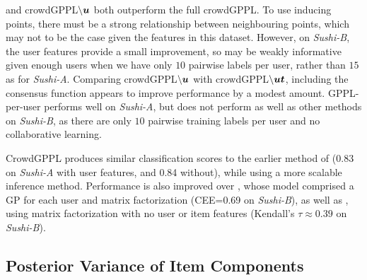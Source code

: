  and crowdGPPL$\backslash\boldsymbol u$ both outperform the full crowdGPPL. 
 To use inducing points,
 there must be a strong relationship between neighbouring points, which
 may not to be the case given the features in this dataset.
 However, on \emph{Sushi-B}, the user features provide a small improvement, so may be weakly informative
 given enough users when we have only $10$ pairwise labels per user, rather than $15$ as for \emph{Sushi-A}.
 Comparing crowdGPPL$\backslash\boldsymbol u$ with crowdGPPL$\backslash\boldsymbol u\boldsymbol t$, including the consensus function appears to improve performance by a modest amount.
 GPPL-per-user performs well on \emph{Sushi-A}, but does not perform as well as other methods on \emph{Sushi-B}, as
there are only $10$ pairwise training labels per user and no collaborative learning.

CrowdGPPL produces similar classification scores to the earlier method of 
 \citet{houlsby2012collaborative} (0.83 on \emph{Sushi-A} with user features, and 0.84 without), 
 while using a more scalable inference method.
Performance is also improved over \citet{khan2014scalable} , 
whose model comprised a GP for each user and matrix factorization (CEE=0.69 on \emph{Sushi-B}),
 as well as \citet{salimans2012collaborative}, using matrix factorization with no user or item features (Kendall's $\tau\approx0.39$ on \emph{Sushi-B}). 


\subsection{Posterior Variance of Item Components}
\label{sec:components}


